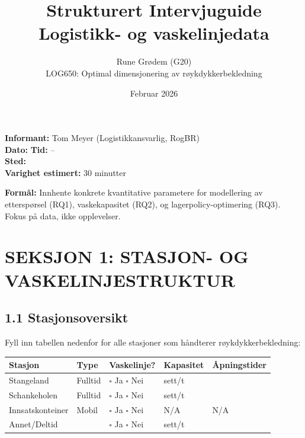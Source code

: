 \documentclass[12pt, a4paper, norsk]{article}
\title{\textbf{Strukturert Intervjuguide}\\
\large Logistikk- og vaskelinjedata}
\author{Rune Grødem (G20)\\
LOG650: Optimal dimensjonering av røykdykkerbekledning}
\date{Februar 2026}
\begin{document}
\maketitle

\noindent
\textbf{Informant:} Tom Meyer (Logistikkansvarlig, RogBR) \\
\textbf{Dato:} \underline{\hspace{4cm}} \quad \textbf{Tid:} \underline{\hspace{2cm}} -- \underline{\hspace{2cm}} \\
\textbf{Sted:} \underline{\hspace{10cm}} \\
\textbf{Varighet estimert:} 30 minutter

\vspace{1cm}

\noindent
\textbf{Formål:} Innhente konkrete kvantitative parametere for modellering av etterspørsel (RQ1), vaskekapasitet (RQ2), og lagerpolicy-optimering (RQ3). Fokus på data, ikke opplevelser.

\newpage

\section*{SEKSJON 1: STASJON- OG VASKELINJESTRUKTUR}
\label{sec:vaskelinjer}

\subsection*{1.1 Stasjonsoversikt}

\noindent
Fyll inn tabellen nedenfor for alle stasjoner som håndterer røykdykkerbekledning:

\vspace{0.5cm}

\begin{center}
\begin{tabular}{|p{3cm}|p{1.8cm}|p{1.5cm}|p{2cm}|p{2.5cm}|}
\hline
\textbf{Stasjon} & \textbf{Type} & \textbf{Vaskelinje?} & \textbf{Kapasitet} & \textbf{Åpningstider} \\
\hline
Stangeland & Fulltid & $\square$ Ja $\square$ Nei & \underline{\hspace{1.5cm}} sett/t & \underline{\hspace{1.8cm}} \\
\hline
Schankeholen & Fulltid & $\square$ Ja $\square$ Nei & \underline{\hspace{1.5cm}} sett/t & \underline{\hspace{1.8cm}} \\
\hline
Innsatskonteiner & Mobil & $\square$ Ja $\square$ Nei & N/A & N/A \\
\hline
Annet/Deltid & \underline{\hspace{1.3cm}} & $\square$ Ja $\square$ Nei & \underline{\hspace{1.5cm}} sett/t & \underline{\hspace{1.8cm}} \\
\hline
\end{tabular}
\end{center}
\end{document}

